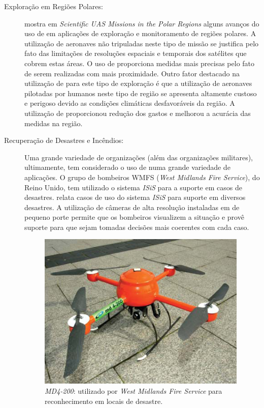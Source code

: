\begin{description}

\item[Exploração em Regiões Polares: ]
\cite{Storvold2009} mostra em \emph{Scientific UAS Missions in the Polar Regions} alguns avanços do uso de \vants em aplicações de exploração e monitoramento de regiões polares. A utilização de aeronaves não tripuladas neste tipo de missão se justifica pelo fato das limitações de resoluções espaciais e temporais dos satélites que cobrem estas áreas. O uso de \vants proporciona medidas mais precisas pelo fato de serem realizadas com mais proximidade. Outro fator destacado na utilização de \vants para este tipo de exploração é que a utilização de
aeronaves pilotadas por humanos neste tipo de região se apresenta altamente custoso e perigoso devido as condições climáticas desfavoráveis da região. A utilização de \vants proporcionou redução dos gastos e melhorou a acurácia das medidas na região. 

\item[Recuperação de Desastres e Incêndios: ]
Uma grande variedade de organizações (além das organizações militares), ultimamente, tem considerado o uso de \vants  numa grande variedade de aplicações. O grupo de bombeiros
WMFS (\emph{West Midlands Fire Service}), do Reino Unido, tem utilizado o sistema \emph{ISiS} para a suporte em casos de desastres. \cite{Mika2009} relata casos de uso do sistema \emph{ISiS} para suporte em diversos desastres. A utilização de câmeras de alta resolução instaladas em \vants de pequeno porte permite que os bombeiros visualizem a situação e provê suporte para que sejam tomadas decisões mais coerentes com cada caso.

\begin{figure}[h!]
\centering
\includegraphics[width=10cm]{pictures/mq4200.png}
\caption{ \emph{MD4-200}: \vant utilizado por \emph{West Midlands Fire Service} para reconhecimento em locais de desastre. }
 \label{fig:md4-200}
\end{figure}


\end{description}

